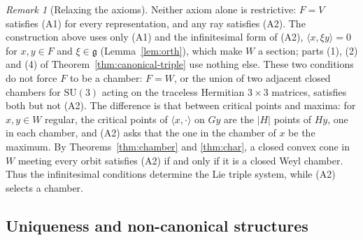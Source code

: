 \documentclass[11pt]{amsart}
\theoremstyle{plain}
\theoremstyle{definition}
\theoremstyle{remark}
\newtheorem{remark}[theorem]{Remark}
\newcommand{\fg}{\mathfrak g}
\newcommand{\ip}[2]{\langle #1,#2\rangle}
\begin{document}
\begin{remark}[Relaxing the axioms]\label{rem:relax}
Neither axiom alone is restrictive: $F=V$ satisfies (A1) for every representation, and any ray satisfies (A2). The construction above uses only (A1) and the infinitesimal form of (A2), $\ip{x}{\xi y}=0$ for $x,y\in F$ and $\xi\in\fg$ (Lemma~\ref{lem:orth}), which make $W$ a section; parts (1), (2) and (4) of Theorem~\ref{thm:canonical-triple} use nothing else. These two conditions do not force $F$ to be a chamber: $F=W$, or the union of two adjacent closed chambers for $\mathrm{SU}(3)$ acting on the traceless Hermitian $3\times3$ matrices, satisfies both but not (A2). The difference is that between critical points and maxima: for $x,y\in W$ regular, the critical points of $\ip{x}{\cdot}$ on $Gy$ are the $|H|$ points of $Hy$, one in each chamber, and (A2) asks that the one in the chamber of $x$ be the maximum. By Theorems~\ref{thm:chamber} and \ref{thm:char}, a closed convex cone in $W$ meeting every orbit satisfies (A2) if and only if it is a closed Weyl chamber. Thus the infinitesimal conditions determine the Lie triple system, while (A2) selects a chamber.
\end{remark}

\subsection{Uniqueness and non-canonical structures}\label{sec:noncanonical}
\end{document}
